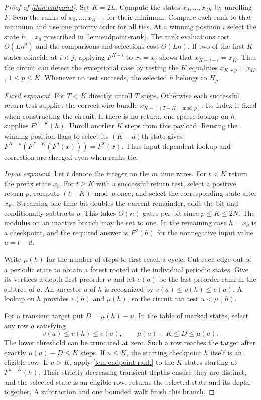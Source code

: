 \documentclass[11pt]{article}
\theoremstyle{definition}
\theoremstyle{remark}
\numberwithin{equation}{section}
\begin{document}
\begin{proof}[Proof of \cref{thm:endpoint}]
Set $K=2L$. Compute the states $x_0,\ldots,x_{2K}$ by unrolling $F$.
Scan the ranks of $x_0,\ldots,x_{K-1}$ for their minimum. Compare
each rank to that minimum and use one priority order for all ties.
At a winning position $i$ select the state $h=x_d$ prescribed in
\cref{lem:endpoint-rank}. The rank evaluations cost $O(Ln^2)$ and the
comparisons and selections cost $O(Ln)$. If two of the first $K$ states
coincide at $i<j$, applying $F^{K-i}$ to $x_i=x_j$ shows that
$x_{K+j-i}=x_K$. Thus the circuit can detect the exceptional case by
testing the $K$ equalities $x_{K+p}=x_K$, $1\le p\le K$. Whenever no
test succeeds, the selected $h$ belongs to $H_\rho$.

\emph{Fixed exponent.} For $T<K$ directly unroll $T$ steps. Otherwise
each successful return test supplies the correct wire bundle
$x_{K+((T-K)\bmod p)}$. Its index is fixed when constructing the
circuit. If there is no return, one sparse lookup on $h$ supplies
$F^{T-K}(h)$. Unroll another $K$ steps from this payload. Reusing
the winning-position flags to select its $(K-d)$th state gives
$F^{K-d}(F^{T-K}(F^d(x)))=F^T(x)$. Thus input-dependent lookup and
correction are charged even when ranks tie.

\emph{Input exponent.} Let $t$ denote the integer on the $m$ time
wires. For $t<K$ return the prefix state $x_t$. For $t\ge K$ with a
successful return test, select a positive return $p$, compute
$(t-K)\bmod p$ once, and select the corresponding state after $x_K$.
Streaming one time bit doubles the current remainder, adds the bit and
conditionally subtracts $p$. This takes $O(n)$ gates per bit since
$p\le K\le2N$. The modulus on an inactive branch may be set to one.
In the remaining case $h=x_d$ is a checkpoint, and the required
answer is $F^u(h)$ for the nonnegative input value $u=t-d$.

Write $\mu(h)$ for the number of steps to first reach a cycle. Cut each
edge out of a periodic state to obtain a forest rooted at the individual
periodic states. Give its vertices a depth-first preorder $v$ and let
$e(a)$ be the last preorder rank in the subtree of $a$. An ancestor $a$
of $h$ is recognized by $v(a)\le v(h)\le e(a)$. A lookup on $h$
provides $v(h)$ and $\mu(h)$, so the circuit can test $u<\mu(h)$.

For a transient target put $D=\mu(h)-u$. In the table of marked
states, select any row $a$ satisfying
\[
 v(a)\le v(h)\le e(a),\qquad \mu(a)-K\le D\le\mu(a).
\]
The lower threshold can be truncated at zero. Such a row reaches the
target after exactly $\mu(a)-D\le K$ steps. If $u\le K$, the starting
checkpoint $h$ itself is an eligible row. If $u>K$, apply
\cref{lem:endpoint-rank} to the $K$ states starting at $F^{u-K}(h)$.
Their strictly decreasing transient depths ensure they are distinct,
and the selected state is an eligible row.
 returns the selected state and its depth
together. A subtraction and one bounded walk finish this branch.


\end{proof}
\end{document}
